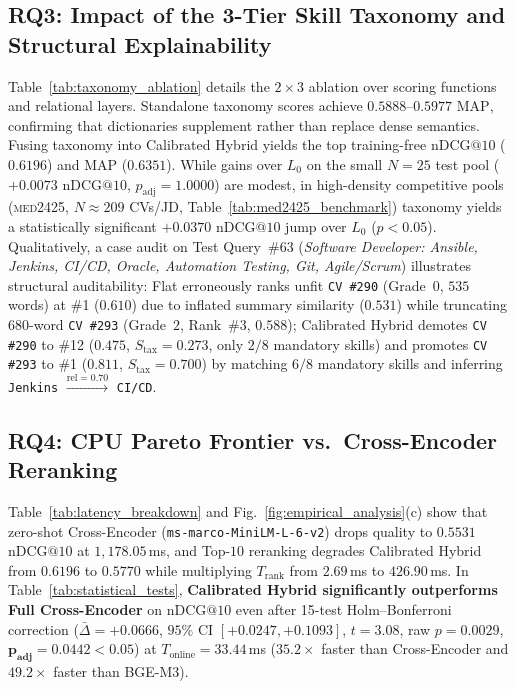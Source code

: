 \subsection{RQ3: Impact of the 3-Tier Skill Taxonomy and Structural Explainability}
\label{sec:rq3}
Table~\ref{tab:taxonomy_ablation} details the $2\times 3$ ablation over scoring functions and relational layers. Standalone taxonomy scores achieve $0.5888$--$0.5977$ $\text{MAP}$, confirming that dictionaries supplement rather than replace dense semantics. Fusing taxonomy into Calibrated Hybrid yields the top training-free $\text{nDCG}@10$ ($0.6196$) and $\text{MAP}$ ($0.6351$). While gains over $L_0$ on the small $N=25$ test pool ($+0.0073$ $\text{nDCG}@10$, $p_{\text{adj}}=1.0000$) are modest, in high-density competitive pools (\textsc{med2425}, $N\approx 209$ CVs/JD, Table~\ref{tab:med2425_benchmark}) taxonomy yields a statistically significant $+0.0370$ $\text{nDCG}@10$ jump over $L_0$ ($p<0.05$). Qualitatively, a case audit on Test Query~\#63 (\textit{Software Developer: Ansible, Jenkins, CI/CD, Oracle, Automation Testing, Git, Agile/Scrum}) illustrates structural auditability: Flat erroneously ranks unfit \texttt{CV \#290} (Grade~$0$, $535$ words) at \#1 ($0.610$) due to inflated summary similarity ($0.531$) while truncating $680$-word \texttt{CV \#293} (Grade~$2$, Rank~\#3, $0.588$); Calibrated Hybrid demotes \texttt{CV \#290} to \#12 ($0.475$, $S_{\text{tax}}=0.273$, only $2/8$ mandatory skills) and promotes \texttt{CV \#293} to \#1 ($0.811$, $S_{\text{tax}}=0.700$) by matching $6/8$ mandatory skills and inferring \texttt{Jenkins} $\xrightarrow{\text{rel}=0.70}$ \texttt{CI/CD}.



\subsection{RQ4: CPU Pareto Frontier vs.\ Cross-Encoder Reranking}
\label{sec:rq4}
Table~\ref{tab:latency_breakdown} and Fig.~\ref{fig:empirical_analysis}(c) show that zero-shot Cross-Encoder (\texttt{ms-marco-\allowbreak MiniLM-L-6-v2}) drops quality to $0.5531$ $\text{nDCG}@10$ at $1{,}178.05$\,ms, and Top-$10$ reranking degrades Calibrated Hybrid from $0.6196$ to $0.5770$ while multiplying $T_{\text{rank}}$ from $2.69$\,ms to $426.90$\,ms. In Table~\ref{tab:statistical_tests}, \textbf{Calibrated Hybrid significantly outperforms Full Cross-Encoder} on $\text{nDCG}@10$ even after 15-test Holm--Bonferroni correction ($\bar{\Delta}=+0.0666$, $95\%$ CI $[+0.0247,+0.1093]$, $t=3.08$, raw $p=0.0029$, $\mathbf{p_{\text{adj}}=0.0442 < 0.05}$) at $T_{\text{online}}=33.44$\,ms ($35.2\times$ faster than Cross-Encoder and $49.2\times$ faster than BGE-M3).

